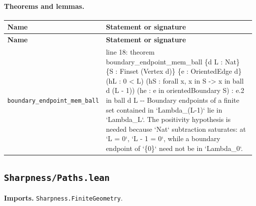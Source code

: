 \documentclass[10pt]{article}
\newcommand{\module}[1]{\texttt{#1}}
\begin{document}
\paragraph{Theorems and lemmas.}
\begin{longtable}{>{\raggedright\arraybackslash}p{} >{\raggedright\arraybackslash}p{}}
\textbf{Name} & \textbf{Statement or signature} \\
\hline
\endfirsthead
\textbf{Name} & \textbf{Statement or signature} \\
\hline
\endhead
\texttt{boundary\_\allowbreak{}endpoint\_\allowbreak{}mem\_\allowbreak{}ball} & {\ttfamily\scriptsize line 18:\allowbreak{} theorem boundary\_\allowbreak{}endpoint\_\allowbreak{}mem\_\allowbreak{}ball \{d L :\allowbreak{} Nat\} \{S :\allowbreak{} Finset (\allowbreak{}Vertex d)\allowbreak{}\} \{e :\allowbreak{} OrientedEdge d\} (\allowbreak{}hL :\allowbreak{} 0 < L)\allowbreak{} (\allowbreak{}hS :\allowbreak{} forall x,\allowbreak{} x in S -\allowbreak{}> x in ball d (\allowbreak{}L -\allowbreak{} 1)\allowbreak{})\allowbreak{} (\allowbreak{}he :\allowbreak{} e in orientedBoundary S)\allowbreak{} :\allowbreak{} e.\allowbreak{}2 in ball d L -\allowbreak{}-\allowbreak{} Boundary endpoints of a finite set contained in `Lambda\_\allowbreak{}(\allowbreak{}L-\allowbreak{}1)\allowbreak{}` lie in `Lambda\_\allowbreak{}L`.\allowbreak{} The positivity hypothesis is needed because `Nat` subtraction saturates:\allowbreak{} at `L =\allowbreak{} 0`,\allowbreak{} `L -\allowbreak{} 1 =\allowbreak{} 0`,\allowbreak{} while a boundary endpoint of `\{0\}` need not be in `Lambda\_\allowbreak{}0`.\allowbreak{}} \\[0.45em]
\end{longtable}

\subsection*{\module{Sharpness/Paths.lean}}
\textbf{Imports.} \module{Sharpness.FiniteGeometry}.
\end{document}
